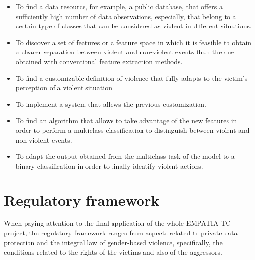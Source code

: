	\begin{itemize}
		\item To find a data resource, for example, a public database, that offers a sufficiently high number of data observations, especially, that belong to a certain type of classes that can be considered as violent in different situations.
		\item To discover a set of features or a feature space in which it is feasible to obtain a clearer separation between violent and non-violent events than the one obtained with conventional feature extraction methods.
		\item To find a customizable definition of violence that fully adapts to the victim's perception of a violent situation. %
		\item To implement a system that allows the previous customization. %
		\item To find an algorithm that allows to take advantage of the new features in order to perform a multiclass classification to distinguish between violent and non-violent events.
		\item To adapt the output obtained from the multiclass task of the model to a binary classification in order to finally identify violent actions.
	\end{itemize}
		
\section{Regulatory framework}

	When paying attention to the final application of the whole EMPATIA-TC project, the regulatory framework ranges from aspects related to private data protection and the integral law of gender-based violence, specifically, the conditions related to the rights of the victims and also of the aggressors. 
	
